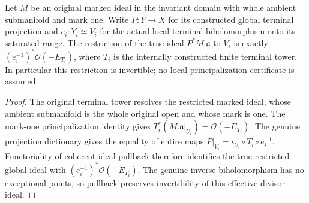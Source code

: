 \begin{theorem}
\label{hir:original-terminal-range-true-principalized-ideal}
\leanok
{}
Let $M$ be an original marked ideal in the invariant domain with whole
ambient submanifold and mark one.  Write $P:Y\to X$ for its constructed
global terminal projection and $e_i:Y_i\simeq V_i$ for the actual local
terminal biholomorphism onto its saturated range.  The restriction of
the true ideal $P^*M.\mathfrak a$ to $V_i$ is exactly
$(e_i^{-1})^*\mathcal O(-E_{T_i})$, where $T_i$ is the internally
constructed finite terminal tower.  In particular this restriction is
invertible; no local principalization certificate is assumed.
\end{theorem}
\begin{proof}
The original terminal tower resolves the restricted marked ideal, whose
ambient submanifold is the whole original open and whose mark is one.
The mark-one principalization identity gives
$T_i^*(M.\mathfrak a|_{U_i})=\mathcal O(-E_{T_i})$.  The genuine
projection dictionary gives the equality of entire maps
$P|_{V_i}=\iota_{U_i}\circ T_i\circ e_i^{-1}$.
Functoriality of coherent-ideal pullback therefore identifies the true
restricted global ideal with $(e_i^{-1})^*\mathcal O(-E_{T_i})$.
The genuine inverse biholomorphism has no exceptional points, so pullback
preserves invertibility of this effective-divisor ideal.
\end{proof}


